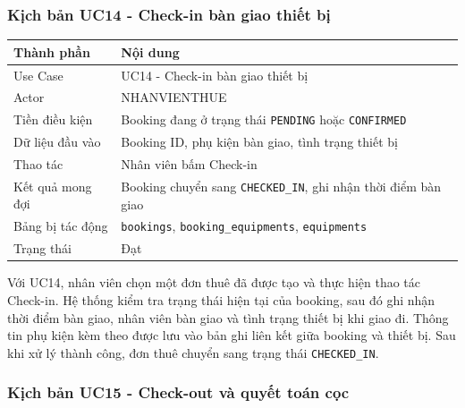 \subsubsection{Kịch bản UC14 - Check-in bàn giao thiết bị}

\begin{table}[H]
	\centering
	\begin{tabularx}{\textwidth}{|l|X|}
		\hline
		\textbf{Thành phần} & \textbf{Nội dung} \\
		\hline
		Use Case & UC14 - Check-in bàn giao thiết bị \\
		\hline
		Actor & NHANVIENTHUE \\
		\hline
		Tiền điều kiện & Booking đang ở trạng thái \texttt{PENDING} hoặc \texttt{CONFIRMED} \\
		\hline
		Dữ liệu đầu vào & Booking ID, phụ kiện bàn giao, tình trạng thiết bị \\
		\hline
		Thao tác & Nhân viên bấm Check-in \\
		\hline
		Kết quả mong đợi & Booking chuyển sang \texttt{CHECKED\_IN}, ghi nhận thời điểm bàn giao \\
		\hline
		Bảng bị tác động & \texttt{bookings}, \texttt{booking\_equipments}, \texttt{equipments} \\
		\hline
		Trạng thái & Đạt \\
		\hline
	\end{tabularx}
\end{table}

Với UC14, nhân viên chọn một đơn thuê đã được tạo và thực hiện thao tác Check-in. Hệ thống kiểm tra trạng thái hiện tại của booking, sau đó ghi nhận thời điểm bàn giao, nhân viên bàn giao và tình trạng thiết bị khi giao đi. Thông tin phụ kiện kèm theo được lưu vào bản ghi liên kết giữa booking và thiết bị. Sau khi xử lý thành công, đơn thuê chuyển sang trạng thái \texttt{CHECKED\_IN}.

\subsubsection{Kịch bản UC15 - Check-out và quyết toán cọc}

